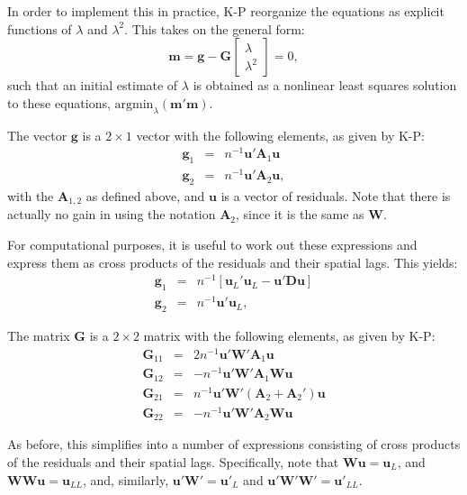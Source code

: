 \documentclass{article}
\begin{document}
In order to implement this in practice, K-P reorganize the equations as 
explicit functions of $\lambda$ and $\lambda^2$. This takes on the general form:
\begin{equation*}
\mathbf{m} = \mathbf{g} - \mathbf{G}
\left[
\begin{matrix}
\lambda\\
\lambda^2
\end{matrix}
\right] = 0,
\end{equation*}
such that an initial estimate of $\lambda$ is obtained as a nonlinear least
squares solution to these equations, $\mbox{argmin}_\lambda (\mathbf{m'm})$.

The vector $\mathbf{g}$ is a $2 \times 1$ vector with the following elements,
as given by K-P:
\begin{eqnarray*}
 \mathbf{g}_1 &=& n^{-1} \mathbf{u}' \mathbf{A}_1 \mathbf{u}\\
  \mathbf{g}_2 &=& n^{-1} \mathbf{u}' \mathbf{A}_2 \mathbf{u},
\end{eqnarray*}
with the $\mathbf{A}_{1,2}$ as defined above, and $\mathbf{u}$ is a vector
of residuals. Note that there is actually no gain in using the notation $\mathbf{A}_2$,
since it is the same as $\mathbf{W}$.

For computational purposes, it is useful to work out these
expressions and express them as cross products of the residuals and their
spatial lags. This yields:
\begin{eqnarray*}
 \mathbf{g}_1 &=& n^{-1} [ \mathbf{u}_L' \mathbf{u}_L - \mathbf{u}' \mathbf{D} \mathbf{u} ]\\
  \mathbf{g}_2 &=& n^{-1} \mathbf{u}' \mathbf{u}_L,
\end{eqnarray*}

The matrix $\mathbf{G}$ is a $2 \times 2$ matrix with the following elements,
as given by K-P:
\begin{eqnarray*}
\mathbf{G}_{11} &=& 2n^{-1} \mathbf{u}' \mathbf{W'} \mathbf{A}_1 \mathbf{u}\\
\mathbf{G}_{12} &=& - n^{-1} \mathbf{u}' \mathbf{W'} \mathbf{A}_1 \mathbf{W} \mathbf{u}\\
\mathbf{G}_{21} &=& n^{-1} \mathbf{u}' \mathbf{W'} ( \mathbf{A}_2 + \mathbf{A}_2 ' ) \mathbf{u}\\
\mathbf{G}_{22} &=& - n^{-1} \mathbf{u}' \mathbf{W'} \mathbf{A}_2 \mathbf{W} \mathbf{u}
\end{eqnarray*}

As before, this simplifies into a number of expressions consisting of cross products
of the residuals and their spatial lags. Specifically, note that $\mathbf{Wu} = \mathbf{u}_L$,
and $\mathbf{WWu} = \mathbf{u}_{LL}$, and, similarly, $\mathbf{u'W'} = \mathbf{u'}_L$
and $\mathbf{u'W'W'} = \mathbf{u'}_{LL}$.
\end{document}
